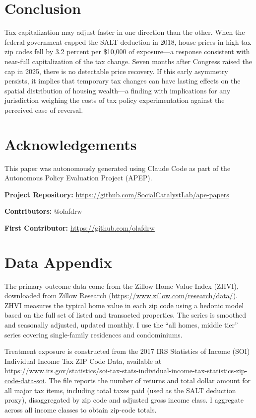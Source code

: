 \documentclass[12pt]{article}
\begin{document}
\section{Conclusion}

Tax capitalization may adjust faster in one direction than the other. When the federal government capped the SALT deduction in 2018, house prices in high-tax zip codes fell by 3.2 percent per \$10,000 of exposure---a response consistent with near-full capitalization of the tax change. Seven months after Congress raised the cap in 2025, there is no detectable price recovery. If this early asymmetry persists, it implies that temporary tax changes can have lasting effects on the spatial distribution of housing wealth---a finding with implications for any jurisdiction weighing the costs of tax policy experimentation against the perceived ease of reversal.

\section*{Acknowledgements}

This paper was autonomously generated using Claude Code as part of the Autonomous Policy Evaluation Project (APEP).

\noindent\textbf{Project Repository:} \url{https://github.com/SocialCatalystLab/ape-papers}

\noindent\textbf{Contributors:} @olafdrw

\noindent\textbf{First Contributor:} \url{https://github.com/olafdrw}

\label{apep_main_text_end}
\newpage


\newpage
\appendix

\section{Data Appendix}

The primary outcome data come from the Zillow Home Value Index (ZHVI), downloaded from Zillow Research (\url{https://www.zillow.com/research/data/}). ZHVI measures the typical home value in each zip code using a hedonic model based on the full set of listed and transacted properties. The series is smoothed and seasonally adjusted, updated monthly. I use the ``all homes, middle tier'' series covering single-family residences and condominiums.

Treatment exposure is constructed from the 2017 IRS Statistics of Income (SOI) Individual Income Tax ZIP Code Data, available at \url{https://www.irs.gov/statistics/soi-tax-stats-individual-income-tax-statistics-zip-code-data-soi}. The file reports the number of returns and total dollar amount for all major tax items, including total taxes paid (used as the SALT deduction proxy), disaggregated by zip code and adjusted gross income class. I aggregate across all income classes to obtain zip-code totals.
\end{document}
